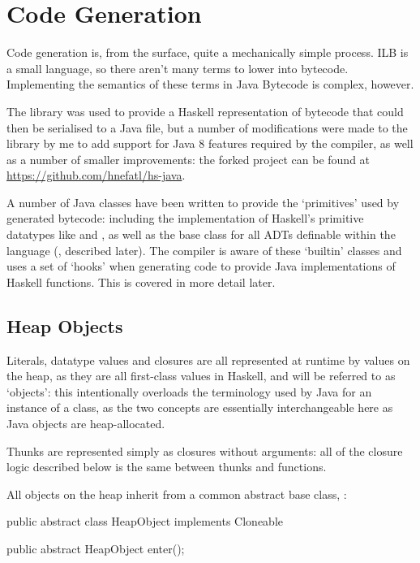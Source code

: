 \documentclass[dissertation.tex]{subfiles}
\begin{document}
\section{Code Generation}
{
    
    Code generation is, from the surface, quite a mechanically simple process. ILB is a small language, so there
    aren't many terms to lower into bytecode. Implementing the semantics of these terms in Java Bytecode is complex,
    however.

    The  library was used to provide a Haskell representation of bytecode that could then be
    serialised to a Java  file, but a number of modifications were made to the library by me to
    add support for Java 8 features required by the compiler, as well as a number of smaller improvements: the
    forked project can be found at \url{https://github.com/hnefatl/hs-java}.

    A number of Java classes have been written to provide the `primitives' used by generated bytecode: including the
    implementation of Haskell's primitive datatypes like  and , as well as the base class
    for all ADTs definable within the language (, described later). The compiler is aware of
    these `builtin' classes and uses a set of `hooks' when generating code to provide Java implementations of
    Haskell functions. This is covered in more detail later.

    \subsection{Heap Objects}\label{sec:heap-objects}
    {

        Literals, datatype values and closures are all represented at runtime by values on the heap, as they are all
        first-class values in Haskell, and will be referred to as `objects': this intentionally overloads the
        terminology used by Java for an instance of a class, as the two concepts are essentially interchangeable
        here as Java objects are heap-allocated.

        Thunks are represented simply as closures without arguments: all of the closure logic described below is the
        same between thunks and functions.

        All objects on the heap inherit from a common abstract base class, :

        \begin{javafigure}
        public abstract class HeapObject implements Cloneable {
            public abstract HeapObject enter();

}
\end{javafigure}}}
\end{document}
